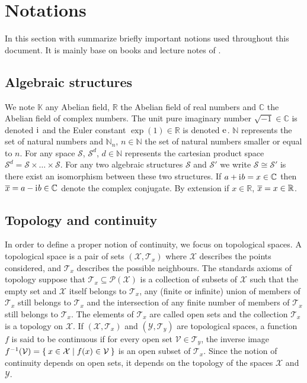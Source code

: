 
\section{Notations}
In this section with summarize briefly important notions used throughout this document. It is mainly base on books and lecture notes of \citet{kurdila2006convex,cotaescu2016elements}.

\subsection{Algebraic structures}
\label{sec:notations}
We note $\mathbb{K}$ any Abelian field, $\mathbb{R}$ the Abelian field of real numbers and $\mathbb{C}$ the Abelian field of complex numbers. The unit pure imaginary number $\sqrt{-1}\in\mathbb{C}$ is denoted ${\mathrm{i}\mkern1mu}$ and the Euler constant $\exp(1)\in\mathbb{R}$ is denoted $\mathrm{e}\mkern1mu$. $\mathbb{N}$ represents the set of natural numbers and $\mathbb{N}_n$, $n\in\mathbb{N}$ the set of natural numbers smaller or equal to $n$. For any space $\mathcal{S}$, $\mathcal{S}^d$, $d\in\mathbb{N}$ represents the cartesian product space $\mathcal{S}^d=\mathcal{S}\times \ldots \times \mathcal{S}$. For any two algebraic structures $\mathcal{S}$ and $\mathcal{S}'$ we write $\mathcal{S}\cong\mathcal{S}'$ is there exist an isomorphism between these two structures. If $a+{\mathrm{i}\mkern1mu} b = x \in \mathbb{C}$ then $\overline{x}=a-{\mathrm{i}\mkern1mu} b\in\mathbb{C}$ denote the complex conjugate. By extension if $x\in\mathbb{R}$, $\overline{x}=x\in\mathbb{R}$.

\subsection{Topology and continuity}{}
In order to define a proper notion of continuity, we focus on topological spaces. A topological space is a pair of sets $(\mathcal{X},\mathcal{T}_x)$ where $\mathcal{X}$ describes the points considered, and $\mathcal{T}_x$ describes the possible neighbours. The standards axioms of topology suppose that $\mathcal{T}_x\subseteq{\mathcal{P}(\mathcal{X})}$ is a collection of subsets of $\mathcal{X}$ such that the empty set and $\mathcal{X}$ itself belongs to $\mathcal{T}_x$, any (finite or infinite) union of members of $\mathcal{T}_x$ still belongs to $\mathcal{T}_x$ and the intersection of any finite number of members of $\mathcal{T}_x$ still belongs to $\mathcal{T}_x$. The elements of $\mathcal{T}_x$ are called open sets and the collection $\mathcal{T}_x$ is a topology on $\mathcal{X}$. If $(\mathcal{X},\mathcal{T}_x)$ and $(\mathcal{Y},\mathcal{T}_y)$ are topological spaces, a function $f$ is said to be continuous if for every open set $\mathcal{V}\in \mathcal{T}_y$, the inverse image $f^{-1}(\mathcal{V}) = \Set{ x \in \mathcal{X} | f ( x ) \in \mathcal{V} }$ is an open subset of $\mathcal{T}_x$. Since the notion of continuity depends on open sets, it depends on the topology of the spaces $\mathcal{X}$ and $\mathcal{Y}$.
